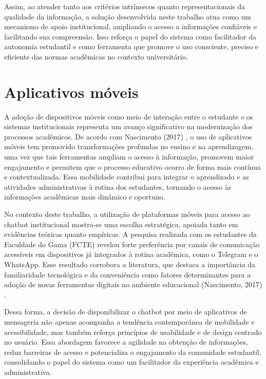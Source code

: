 Assim, ao atender tanto aos critérios intrínsecos quanto representacionais da qualidade da informação, a solução desenvolvida neste trabalho atua como um mecanismo de apoio institucional, ampliando o acesso a informações confiáveis e facilitando sua compreensão. Isso reforça o papel do sistema como facilitador da autonomia estudantil e como ferramenta que promove o uso consciente, preciso e eficiente das normas acadêmicas no contexto universitário.

\section{Aplicativos móveis}

A adoção de dispositivos móveis como meio de interação entre o estudante e os sistemas institucionais representa um avanço significativo na modernização dos processos acadêmicos. De acordo com Nascimento (2017) \cite{nascimento2017mobile}, o uso de aplicativos móveis tem promovido transformações profundas no ensino e na aprendizagem, uma vez que tais ferramentas ampliam o acesso à informação, promovem maior engajamento e permitem que o processo educativo ocorra de forma mais contínua e contextualizada. Essa mobilidade contribui para integrar o aprendizado e as atividades administrativas à rotina dos estudantes, tornando o acesso às informações acadêmicas mais dinâmico e oportuno.

No contexto deste trabalho, a utilização de plataformas móveis para acesso ao chatbot institucional mostra-se uma escolha estratégica, apoiada tanto em evidências teóricas quanto empíricas. A pesquisa realizada com os estudantes da Faculdade do Gama (FCTE) revelou forte preferência por canais de comunicação acessíveis em dispositivos já integrados à rotina acadêmica, como o Telegram e o WhatsApp. Esse resultado corrobora a literatura, que destaca a importância da familiaridade tecnológica e da conveniência como fatores determinantes para a adoção de novas ferramentas digitais no ambiente educacional (Nascimento, 2017) \cite{nascimento2017mobile}.

Dessa forma, a decisão de disponibilizar o chatbot por meio de aplicativos de mensageria não apenas acompanha a tendência contemporânea de mobilidade e acessibilidade, mas também reforça princípios de usabilidade e de design centrado no usuário. Essa abordagem favorece a agilidade na obtenção de informações, reduz barreiras de acesso e potencializa o engajamento da comunidade estudantil, consolidando o papel do sistema como um facilitador da experiência acadêmica e administrativa.

